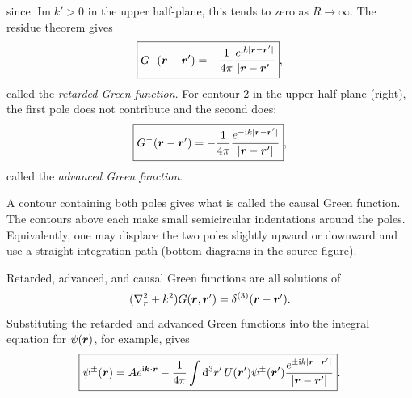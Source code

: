 since $\operatorname{Im}k'>0$ in the upper half-plane, this tends to zero as $R\to\infty$. The residue theorem gives
\begin{equation}
\boxed{G^+(\bm{r}-\bm{r}')=-\frac1{4\pi}\frac{e^{\mathrm{i} k|\bm{r}-\bm{r}'|}}{|\bm{r}-\bm{r}'|}},
\end{equation}
called the \emph{retarded Green function}. For contour 2 in the upper half-plane (right), the first pole does not contribute and the second does:
\begin{equation}
\boxed{G^-(\bm{r}-\bm{r}')=-\frac1{4\pi}\frac{e^{-\mathrm{i} k|\bm{r}-\bm{r}'|}}{|\bm{r}-\bm{r}'|}},
\end{equation}
called the \emph{advanced Green function}.

A contour containing both poles gives what is called the causal Green function. The contours above each make small semicircular indentations around the poles. Equivalently, one may displace the two poles slightly upward or downward and use a straight integration path (bottom diagrams in the source figure).

Retarded, advanced, and causal Green functions are all solutions of
\begin{equation}
(\nabla_{\bm{r}}^2+k^2)G(\bm{r},\bm{r}')=\delta^{(3)}(\bm{r}-\bm{r}').
\end{equation}
Substituting the retarded and advanced Green functions into the integral equation for $\psi(\bm{r})$, for example, gives
\begin{equation}
\boxed{\psi^\pm(\bm{r})=Ae^{\mathrm{i}\bm{k}\cdot\bm{r}}
-\frac1{4\pi}\int\mathrm{d}^3r'\,U(\bm{r}')\psi^\pm(\bm{r}')
\frac{e^{\pm\mathrm{i} k|\bm{r}-\bm{r}'|}}{|\bm{r}-\bm{r}'|}}.
\end{equation}
